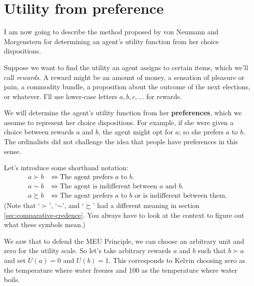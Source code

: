 

\section{Utility from preference}

I am now going to describe the method proposed by von Neumann and
Morgenstern for determining an agent's utility function from her
choice dispositions.

Suppose we want to find  the utility an agent assigns to certain
items, which we'll call \emph{rewards}. A reward might be an amount of
money, a sensation of pleasure or pain, a commodity bundle, a
proposition about the outcome of the next elections, or whatever. I'll
use lower-case letters $a,b,c,\ldots$ for rewards. 

We will determine the agent's utility function from her
\textbf{preferences}, which we assume to represent her choice
dispositions. For example, if she were given a choice between rewards
$a$ and $b$, the agent might opt for $a$; so she prefers $a$ to
$b$. The ordinalists did not challenge the idea that people have
preferences in this sense.

Let's introduce some shorthand notation:
%
\begin{align*}
  a \succ b &\Leftrightarrow \text{The agent prefers $a$ to $b$}.\\
  a \sim b &\Leftrightarrow \text{The agent is indifferent between $a$ and $b$.}\\
  a \succsim b & \Leftrightarrow \text{The agent prefers $a$ to $b$ or is indifferent between them.}
\end{align*}
%
(Note that `$\succ$', `$\sim$', and `$\succsim$' had a different
meaning in section \ref{sec:comparative-credence}. You always have to
look at the context to figure out what these symbols mean.)

We saw that to defend the MEU Principle, we can choose an arbitrary
unit and zero for the utility scale. So let's take arbitrary rewards
$a$ and $b$ such that $b \succ a$ and set $U(a) = 0$ and $U(b) =
1$. This corresponds to Kelvin choosing zero as the temperature where
water freezes and 100 as the temperature where water boils. 

